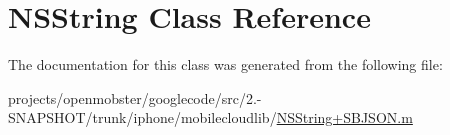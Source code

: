 \hypertarget{class_n_s_string}{
\section{\-N\-S\-String \-Class \-Reference}
\label{class_n_s_string}
}


\-The documentation for this class was generated from the following file\-:\begin{DoxyCompactItemize}
\item 
projects/openmobster/googlecode/src/2.-\/\-S\-N\-A\-P\-S\-H\-O\-T/trunk/iphone/mobilecloudlib/\hyperlink{_n_s_string_09_s_b_j_s_o_n_8m}{\-N\-S\-String+\-S\-B\-J\-S\-O\-N.\-m}\end{DoxyCompactItemize}
